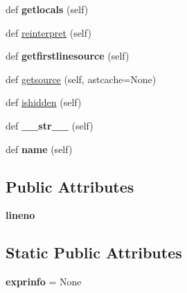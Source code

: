 \begin{DoxyCompactItemize}
def {\bfseries getlocals} (self)
\item 
def \hyperlink{classpy_1_1__code_1_1code_1_1_traceback_entry_a040c68908307c271a1b2473a7a29319c}{reinterpret} (self)
\item 
\mbox{\label{classpy_1_1__code_1_1code_1_1_traceback_entry_a28ceb9d04e0568419003c7724f7e1e8d}} 
def {\bfseries getfirstlinesource} (self)
\item 
def \hyperlink{classpy_1_1__code_1_1code_1_1_traceback_entry_ab958349230aaeb2617fc6289088ca974}{getsource} (self, astcache=None)
\item 
def \hyperlink{classpy_1_1__code_1_1code_1_1_traceback_entry_a0507c38ee8b75dea4701741170c2367e}{ishidden} (self)
\item 
\mbox{\label{classpy_1_1__code_1_1code_1_1_traceback_entry_a62075a71706e210048a85511d8ef7991}} 
def {\bfseries \+\_\+\+\_\+str\+\_\+\+\_\+} (self)
\item 
\mbox{\label{classpy_1_1__code_1_1code_1_1_traceback_entry_a638fa61d22187d2e0d95069e5ecf1832}} 
def {\bfseries name} (self)
\end{DoxyCompactItemize}
\subsection*{Public Attributes}
\begin{DoxyCompactItemize}
\item 
\mbox{\label{classpy_1_1__code_1_1code_1_1_traceback_entry_a669ff076b868f47d84ed2e4bebe21fba}} 
{\bfseries lineno}
\end{DoxyCompactItemize}
\subsection*{Static Public Attributes}
\begin{DoxyCompactItemize}
\item 
\mbox{\label{classpy_1_1__code_1_1code_1_1_traceback_entry_a91f7849a9702af8779127f4843c5479b}} 
{\bfseries exprinfo} = None
\end{DoxyCompactItemize}
